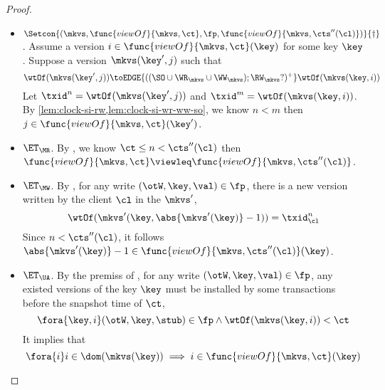 \begin{proof}
\begin{itemize}
        \item \( \Setcon{(\mkvs, \func{viewOf}{\mkvs,\ct}, \fp, \func{viewOf}{\mkvs,\cts''(\cl)})}{\dagger} \).
            Assume a version \( i \in \func{viewOf}{\mkvs,\ct}(\key) \) for some key \( \key \).
            Suppose a version \( \mkvs(\key',j)\) such that 
            \[ 
                \wtOf(\mkvs(\key',j)) \toEDGE{((\SO \cup \WR_{\mkvs} \cup \WW_{\mkvs}) ; \RW_{\mkvs}?)^+} \wtOf(\mkvs(\key,i))
            \]
            Let \( \txid^n = \wtOf(\mkvs(\key',j)) \) and \( \txid^m = \wtOf(\mkvs(\key,i)) \).
            By \cref{lem:clock-si-rw,lem:clock-si-wr-ww-so}, we know \( n < m \) then \( j  \in \func{viewOf}{\mkvs,\ct}(\key')\).
        \item \( \ET_\MR \).
            By , we know \( \ct \leq n < \cts''(\cl) \) then \( \func{viewOf}{\mkvs,\ct} \viewleq \func{viewOf}{\mkvs,\cts''(\cl)} \).
        \item \( \ET_\MW \).
            By , for any write \( (\otW, \key, \val) \in \fp \), there is a new version written by the client \( \cl \) in the \( \mkvs'  \),
            \[
                \wtOf(\mkvs'(\key,\abs{\mkvs'(\key)} - 1)) = \txid_\cl^{n}
            \]
            Since \( n < \cts''(\cl)\), it follows \( \abs{\mkvs'(\key)} - 1 \in \func{viewOf}{\mkvs,\cts''(\cl)}(\key) \).
        \item \( \ET_\UA \).
            By the premiss of , for any write \( (\otW, \key, \val) \in \fp \), any existed versions of the key \( \key \)
            must be installed by some transactions before the snapshot time of \( \ct \),
            \[
                \fora{\key,i} (\otW, \key, \stub) \in \fp \land \wtOf(\mkvs(\key,i)) < \ct 
            \]
            It implies that 
            \[ 
                \fora{i} i \in \dom(\mkvs(\key)) \implies i \in \func{viewOf}{\mkvs,\ct}(\key) 
            \]
    \end{itemize}
\end{proof}

